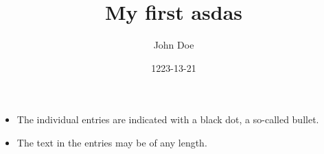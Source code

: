 \documentclass{article}
\title{My first asdas}
\date{1223-13-21}
\author{John Doe}
\begin{document}
\begin{itemize}
  \item The individual entries are indicated with a black dot, a so-called bullet.
  \item The text in the entries may be of any length.
\end{itemize}
\end{document}
